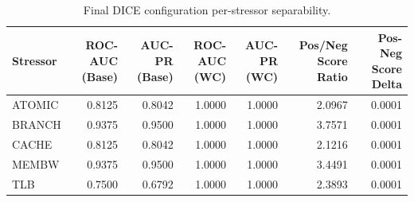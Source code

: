 \begin{table}[t]
\centering
\caption{Final DICE configuration per-stressor separability.}
\label{tab:dice_full_stressor}
\footnotesize
\begin{tabular}{lrrrrrr}
\toprule
Stressor & ROC-AUC (Base) & AUC-PR (Base) & ROC-AUC (WC) & AUC-PR (WC) & Pos/Neg Score Ratio & Pos-Neg Score Delta \\
\midrule
ATOMIC & 0.8125 & 0.8042 & 1.0000 & 1.0000 & 2.0967 & 0.0001 \\
BRANCH & 0.9375 & 0.9500 & 1.0000 & 1.0000 & 3.7571 & 0.0001 \\
CACHE & 0.8125 & 0.8042 & 1.0000 & 1.0000 & 2.1216 & 0.0001 \\
MEMBW & 0.9375 & 0.9500 & 1.0000 & 1.0000 & 3.4491 & 0.0001 \\
TLB & 0.7500 & 0.6792 & 1.0000 & 1.0000 & 2.3893 & 0.0001 \\
\bottomrule
\end{tabular}

\end{table}
